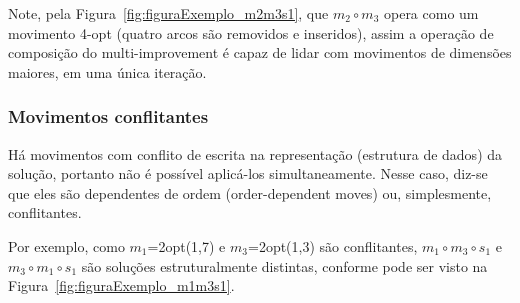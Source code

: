 Note, pela Figura~\ref{fig:figuraExemplo_m2m3s1}, que $m_2 \circ m_3$ opera como um movimento 4-opt (quatro arcos são removidos e inseridos), assim a operação de composição do multi-improvement é capaz de lidar com movimentos de dimensões maiores, em uma única iteração.

\subsubsection{Movimentos conflitantes} \label{subsubsec:movimentosConflitantes}

Há movimentos com conflito de escrita na representação (estrutura de dados) da solução, portanto não é possível aplicá-los simultaneamente. Nesse caso, diz-se que eles são dependentes de ordem (order-dependent moves) ou, simplesmente, conflitantes.

Por exemplo, como $m_1$=2opt(1,7) e $m_3$=2opt(1,3) são conflitantes, $m_1 \circ m_3 \circ s_1$ e $m_3 \circ m_1 \circ s_1$ são soluções estruturalmente distintas, conforme pode ser visto na Figura~\ref{fig:figuraExemplo_m1m3s1}.

